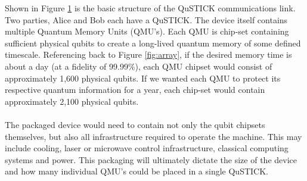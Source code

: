 \documentclass[aps,prl,twocolumn,10pt,nofootinbib]{revtex4}
\begin{document}
\begin{figure}[ht!]
	\caption{}
	\label{fig:qustick1}
\end{figure}
Shown in Figure \ref{fig:qustick1} is the basic structure of the QuSTICK communications link.  Two parties, Alice and Bob each have a QuSTICK.  The device itself contains multiple Quantum Memory Units (QMU's).  Each QMU is chip-set containing sufficient physical qubits to create a long-lived quantum memory of some defined timescale.  Referencing back to Figure \ref{fig:array}, if the desired memory time is about a day (at a fidelity of 99.99\%), each QMU chipset would consist of approximately 1,600 physical qubits.  If we wanted each QMU to protect its respective quantum information for a year, each chip-set would contain approximately 2,100 physical qubits. 
\\
\\
The packaged device would need to contain not only the qubit chipsets themselves, but also all infrastructure required to operate the machine.  This may include cooling, laser or microwave control infrastructure, classical computing systems and power.  This packaging will ultimately dictate the size of the device and how many individual QMU's could be placed in a single QuSTICK.
\end{document}
